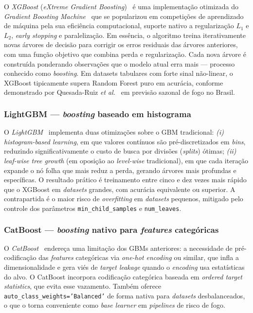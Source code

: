 O \emph{XGBoost} (\emph{eXtreme Gradient Boosting})~\cite{chen2016xgboost} é uma implementação otimizada do \emph{Gradient Boosting Machine}~\cite{friedman2001greedy} que se popularizou em competições de aprendizado de máquina pela sua eficiência computacional, suporte nativo a regularização \(L_1\) e \(L_2\), \emph{early stopping} e paralelização. Em essência, o algoritmo treina iterativamente novas árvores de decisão para corrigir os erros residuais das árvores anteriores, com uma função objetivo que combina perda e regularização. Cada nova árvore é construída ponderando observações que o modelo atual erra mais --- processo conhecido como \emph{boosting}. Em datasets tabulares com forte sinal não-linear, o XGBoost tipicamente supera Random Forest puro em acurácia, conforme demonstrado por Quesada-Ruiz \emph{et al.}~\cite{npjhazards2025fire} em previsão sazonal de fogo no Brasil.

\subsubsection{LightGBM --- \emph{boosting} baseado em histograma}
\label{subsec:fund_lightgbm}

O \emph{LightGBM}~\cite{ke2017lightgbm} implementa duas otimizações sobre o GBM tradicional: \emph{(i)} \emph{histogram-based learning}, em que valores contínuos são pré-discretizados em \emph{bins}, reduzindo significativamente o custo de busca por divisões (\emph{splits}) ótimas; \emph{(ii)} \emph{leaf-wise tree growth} (em oposição ao \emph{level-wise} tradicional), em que cada iteração expande o nó folha que mais reduz a perda, gerando árvores mais profundas e específicas. O resultado prático é treinamento entre cinco e dez vezes mais rápido que o XGBoost em \emph{datasets} grandes, com acurácia equivalente ou superior. A contrapartida é o maior risco de \emph{overfitting} em \emph{datasets} pequenos, mitigado pelo controle dos parâmetros \texttt{min\_child\_samples} e \texttt{num\_leaves}.

\subsubsection{CatBoost --- \emph{boosting} nativo para \emph{features} categóricas}
\label{subsec:fund_catboost}

O \emph{CatBoost}~\cite{prokhorenkova2018catboost} endereça uma limitação dos GBMs anteriores: a necessidade de pré-codificação das \emph{features} categóricas via \emph{one-hot encoding} ou similar, que infla a dimensionalidade e gera viés de \emph{target leakage} quando o \emph{encoding} usa estatísticas do alvo. O CatBoost incorpora codificação categórica baseada em \emph{ordered target statistics}, que evita esse vazamento. Também oferece \texttt{auto\_class\_weights='Balanced'} de forma nativa para \emph{datasets} desbalanceados, o que o torna conveniente como \emph{base learner} em \emph{pipelines} de risco de fogo.

